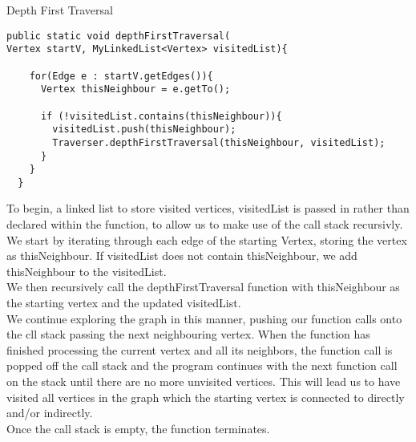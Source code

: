 \documentclass[a4paper]{article}
\begin{document}
\newpage

 


\begin{algorithm}
\caption{Depth First Traversal}\label{euclid}

\begin{verbatim}
public static void depthFirstTraversal(
Vertex startV, MyLinkedList<Vertex> visitedList){

    for(Edge e : startV.getEdges()){
      Vertex thisNeighbour = e.getTo();

      if (!visitedList.contains(thisNeighbour)){
        visitedList.push(thisNeighbour);
        Traverser.depthFirstTraversal(thisNeighbour, visitedList);
      }
    }
  }
\end{verbatim}
\end{algorithm}


\vspace{12mm}







To begin, a linked list to store visited vertices, visitedList 
is passed in rather than declared within the function,
to allow us to make use of the call stack recursivly. \\

We start by iterating through each edge of the starting Vertex,
storing the vertex as thisNeighbour. 
If visitedList does not contain thisNeighbour,
we add thisNeighbour to the visitedList. \\

We then recursively call the depthFirstTraversal function with thisNeighbour as 
the starting vertex and the updated visitedList. \\

We continue exploring the graph in this manner, 
pushing our function calls onto the cll stack passing the next neighbouring vertex.
When the function has finished processing the current vertex and all its neighbors, 
the function call is popped off the call stack and the program continues with the next function call on the stack
until there are no more unvisited vertices.
This will lead us to have visited all vertices in the graph which the starting vertex is connected to directly and/or indirectly.\\
Once the call stack is empty, the function terminates. \\
\newpage
\end{document}
